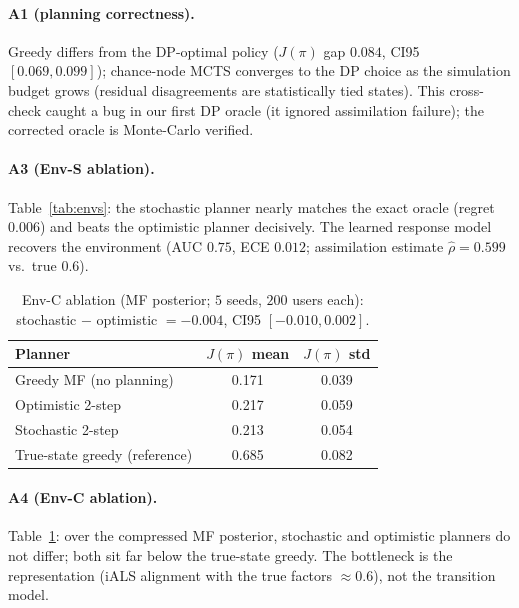 \documentclass[11pt,a4paper]{article}
\newcommand{\J}{J(\pi)}
\begin{document}
\paragraph{A1 (planning correctness).}
Greedy differs from the DP-optimal policy ($\J$ gap $0.084$, CI95 $[0.069, 0.099]$);
chance-node MCTS converges to the DP choice as the simulation budget grows (residual
disagreements are statistically tied states). This cross-check caught a bug in our first
DP oracle (it ignored assimilation failure); the corrected oracle is Monte-Carlo
verified.

\paragraph{A3 (Env-S ablation).}
Table~\ref{tab:envs}: the stochastic planner nearly matches the exact oracle
(regret $0.006$) and beats the optimistic planner decisively. The learned response
model recovers the environment (AUC $0.75$, ECE $0.012$; assimilation estimate
$\hat\rho = 0.599$ vs.\ true $0.6$).

\begin{table}[t]
\centering\small
\caption{Env-C ablation (MF posterior; $5$ seeds, $200$ users each):
stochastic $-$ optimistic $= -0.004$, CI95 $[-0.010, 0.002]$.}
\label{tab:envc}
\begin{tabular}{@{}lcc@{}}
\toprule
Planner & $\J$ mean & $\J$ std \\
\midrule
Greedy MF (no planning) & 0.171 & 0.039 \\
Optimistic 2-step & 0.217 & 0.059 \\
Stochastic 2-step & 0.213 & 0.054 \\
True-state greedy (reference) & 0.685 & 0.082 \\
\bottomrule
\end{tabular}
\end{table}

\paragraph{A4 (Env-C ablation).}
Table~\ref{tab:envc}: over the compressed MF posterior, stochastic and optimistic
planners do not differ; both sit far below the true-state greedy. The bottleneck is the
representation (iALS alignment with the true factors $\approx 0.6$), not the transition
model.
\end{document}
